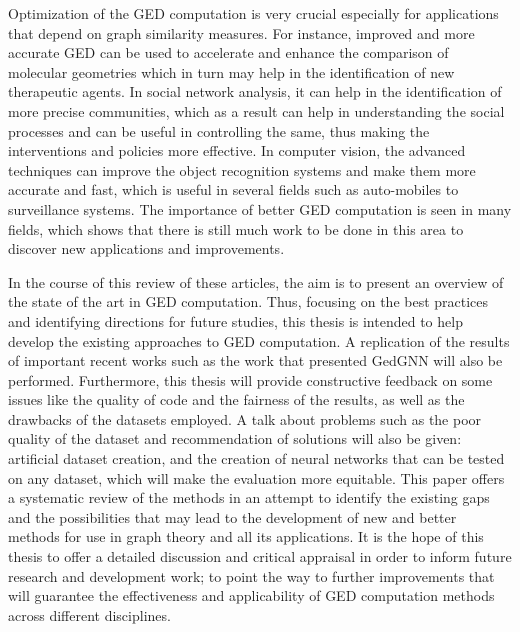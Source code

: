 \documentclass[../Thesis.tex]{subfiles}
\begin{document}
	Optimization of the GED computation is very crucial especially for applications that depend on graph similarity measures. For instance, improved and more accurate GED can be used to accelerate and enhance the comparison of molecular geometries which in turn may help in the identification of new therapeutic agents. In social network analysis, it can help in the identification of more precise communities, which as a result can help in understanding the social processes and can be useful in controlling the same, thus making the interventions and policies more effective. In computer vision, the advanced techniques can improve the object recognition systems and make them more accurate and fast, which is useful in several fields such as auto-mobiles to surveillance systems. The importance of better GED computation is seen in many fields, which shows that there is still much work to be done in this area to discover new applications and improvements.
	
	In the course of this review of these articles, the aim is to present an overview of the state of the art in GED computation. Thus, focusing on the best practices and identifying directions for future studies, this thesis is intended to help develop the existing approaches to GED computation. A replication of the results of important recent works such as the work that presented GedGNN will also be performed. Furthermore, this thesis will provide constructive feedback on some issues like the quality of code and the fairness of the results, as well as the drawbacks of the datasets employed. A talk about problems such as the poor quality of the dataset and recommendation of solutions will also be given: artificial dataset creation, and the creation of neural networks that can be tested on any dataset, which will make the evaluation more equitable. This paper offers a systematic review of the methods in an attempt to identify the existing gaps and the possibilities that may lead to the development of new and better methods for use in graph theory and all its applications. It is the hope of this thesis to offer a detailed discussion and critical appraisal in order to inform future research and development work; to point the way to further improvements that will guarantee the effectiveness and applicability of GED computation methods across different disciplines.
\end{document}

